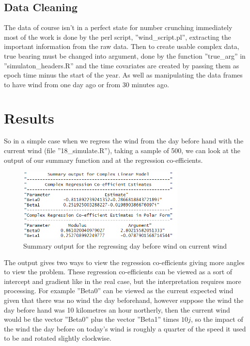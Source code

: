 \documentclass[honours,12pt]{unswthesis}
\numberwithin{equation}{section}
\begin{document}
\subsection{Data Cleaning}

The data of course isn't in a perfect state for number crunching immediately most of the work is done by the perl script, ''wind\_script.pl'', extracting the important information from the raw data. Then to create usable complex data,  true bearing must be changed into argument, done by the function ''true\_arg'' in ''simulaton\_headers.R'' and the time covariates are created by passing them as epoch time minus the start of the year. As well as manipulating the data frames to have wind from one day ago or from 30 minutes ago.

\section{Results}

So in a simple case when we regress the wind from the day before hand with the current wind (file ''18\_simulate.R''), taking a sample of 500, we can look at the output of our summary function and at the regression co-efficients.

\newpage

\begin{figure}[h]
	\centering
	\includegraphics[width = 0.75\textwidth]{graphics/dayBeforeCoef}
	\caption{Summary output for the regressing day before wind on current wind}
\end{figure}

\noindent The output gives two ways to view the regression co-efficients giving more angles to view the problem. These regression co-efficients can be viewed as a sort of intercept and gradient like in the real case, but the interpretation requires more processing. For example ''Beta0'' can be viewed as the current expected wind given that there was no wind the day beforehand, however suppose the wind the day before hand was 10 kilometres an hour northerly, then the current wind would be the vector ''Beta0'' plus the vector ''Beta1'' times $10j$, so the impact of the wind the day before on today's wind is roughly a quarter of the speed it used to be and rotated slightly clockwise. \par
\end{document}
